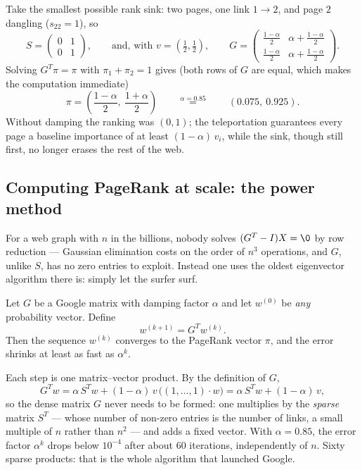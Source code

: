 \begin{example}
Take the smallest possible rank sink: two pages, one link $1\to 2$, and page $2$ dangling
($s_{22} = 1$), so
\[
S = \left( \begin{array}{cc} 0 & 1\\ 0 & 1 \end{array} \right),
\qquad\text{and, with } v = \left(\tfrac12,\tfrac12\right),\qquad
G = \left( \begin{array}{cc} \tfrac{1-\alpha}{2} & \alpha + \tfrac{1-\alpha}{2}\\[2pt]
\tfrac{1-\alpha}{2} & \alpha+\tfrac{1-\alpha}{2} \end{array} \right).
\]
Solving $G^T \pi = \pi$ with $\pi_1+\pi_2 = 1$ gives (both rows of $G$ are equal, which makes the
computation immediate)
\[
\pi = \left( \frac{1-\alpha}{2},\ \frac{1+\alpha}{2} \right)
\qquad\overset{\alpha = 0.85}{=}\qquad (0.075,\ 0.925).
\]
Without damping the ranking was $(0,1)$; the teleportation guarantees every page a baseline importance of
at least $(1-\alpha)\, v_i$, while the sink, though still first, no longer erases the rest of the web.
\end{example}

\subsection{Computing PageRank at scale: the power method}

For a web graph with $n$ in the billions, nobody solves $(G^T - I)X = \0$ by row reduction — Gaussian
elimination costs on the order of $n^3$ operations, and $G$, unlike $S$, has no zero entries to exploit.
Instead one uses the oldest eigenvector algorithm there is: simply let the surfer surf.

\begin{fact}
Let $G$ be a Google matrix with damping factor $\alpha$ and let $w^{(0)}$ be \emph{any} probability
vector. Define
\[
w^{(k+1)} = G^T w^{(k)}.
\]
Then the sequence $w^{(k)}$ converges to the PageRank vector $\pi$, and the error shrinks at least as fast
as $\alpha^k$.
\end{fact}

\begin{remark}
Each step is one matrix--vector product. By the definition of $G$,
\[
G^T w = \alpha\, S^T w + (1-\alpha)\, v\, \big((1,\ldots,1) \cdot w\big) = \alpha\, S^T w + (1-\alpha)\, v,
\]
so the dense matrix $G$ never needs to be formed: one multiplies by the \emph{sparse} matrix $S^T$ — whose
number of non-zero entries is the number of links, a small multiple of $n$ rather than $n^2$ — and adds a
fixed vector. With $\alpha = 0.85$, the error factor $\alpha^{k}$ drops below $10^{-4}$ after about $60$
iterations, independently of $n$. Sixty sparse products: that is the whole algorithm that launched
Google.
\end{remark}

